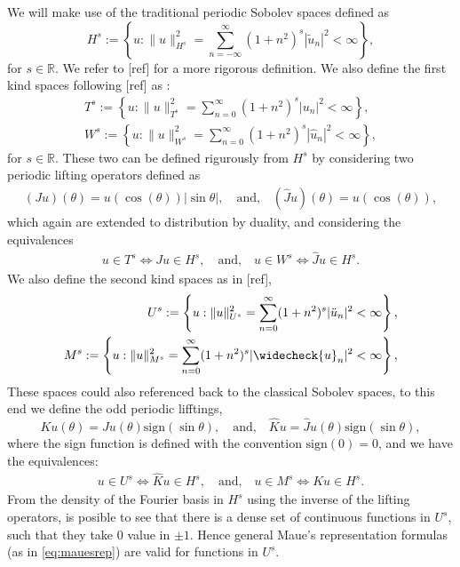 \documentclass{article}
\newcommand{\todo}[1]{{\color{red}[#1]}}
\newcommand{\IR}{{\mathbb R}}
\begin{document}
We will make use of the traditional periodic Sobolev spaces defined as 
$$
H^s := \left\lbrace u : \| u\|_{H^s}^2 = \sum_{n=-\infty}^\infty (1+n^2)^s |\widetilde{u}_n|^2 < \infty \right\rbrace,
$$
for $s\in \IR$. We refer to \todo{ref} for a more rigorous definition. We also define the first kind spaces following \todo{ref} as : 
\begin{align*}
T^s := \left\lbrace u : \| u\|_{T^s}^2 = \sum_{n=0}^\infty (1+n^2)^s |{u}_n|^2 < \infty \right\rbrace, \\
W^s := \left\lbrace u : \| u\|_{W^s}^2 = \sum_{n=0}^\infty (1+n^2)^s |\widehat{u}_n|^2 < \infty \right\rbrace,
\end{align*} 
for $s \in \IR$. These two can be defined rigurously from $H^s$ by considering two periodic lifting operators defined as 
\begin{align}
\label{eq:liffings}
(Ju) (\theta) = u(\cos(\theta)) | \sin \theta|, \quad \text{and,} \quad
(\widehat{J}u)(\theta) = u (\cos(\theta)),
\end{align}
which again are extended to distribution by duality, and considering the equivalences 
\begin{align*}
u \in T^s \Leftrightarrow Ju \in H^s, \quad \text{and,} \quad u \in W^s \Leftrightarrow \widehat{J}u \in H^s.
\end{align*}
We also define the second kind spaces as in \todo{ref}, 
\begin{align*}
U^s := \left\lbrace u : \| u\|_{U^s}^2 = \sum_{n=0}^\infty (1+n^2)^s |\ddot{u}_n|^2 < \infty \right\rbrace, \\
M^s := \left\lbrace u : \| {u}\|_{M^s}^2 = \sum_{n=0}^\infty (1+n^2)^s |\widecheck{u}_n|^2 < \infty \right\rbrace,
\end{align*} 
These spaces could also referenced back to the classical Sobolev spaces, to this end we define the odd periodic lifftings, 
$$
Ku(\theta) = Ju(\theta) \text{sign}(\sin\theta), \quad \text{and,}\quad \widehat{K}u = \widehat{J}u(\theta) \text{sign}(\sin\theta),
$$
where the sign function is defined with the convention $\text{sign}(0)=0$, and we have the equivalences: 
\begin{align*}
u \in U^s \Leftrightarrow \widehat{K}u \in H^s, \quad \text{and,} \quad u \in M^s \Leftrightarrow Ku \in H^s.
\end{align*}
From the density of the Fourier basis in $H^s$ using the inverse of the lifting operators, is posible to see that there is a dense set of continuous  functions in $U^s$, such that they take $0$ value in $\pm 1$. Hence general Maue's representation formulas (as in \eqref{eq:mauesrep}) are valid for functions in $U^s$.  
\end{document}

